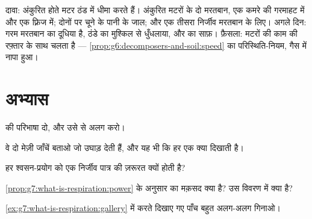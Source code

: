\begin{example}[ठंडे बीज पर यह विधि]\label{ex:g7:what-is-respiration:coldseed}
दावा: अंकुरित होते मटर ठंड में धीमा  करते हैं। अंकुरित मटरों के दो
मरतबान, एक कमरे की गरमाहट में और एक फ़्रिज में; दोनों पर चूने के पानी के
जाल; और एक तीसरा निर्जीव मरतबान  के लिए। अगले दिन: गरम मरतबान
का  दूधिया है, ठंडे का मुश्किल से धुँधलाया, और  का
साफ़। फ़ैसला:  मटरों की काम की रफ़्तार के साथ चलता है ---
\cref{prop:g6:decomposers-and-soil:speed} का परिस्थिति-नियम, गैस में
नापा हुआ।
\end{example}

\section{अभ्यास}

\begin{exercise}[$\star$]\label{exo:g7:what-is-respiration:1}
 की परिभाषा दो, और उसे  से अलग करो।
\end{exercise}

\begin{exercise}[$\star$]\label{exo:g7:what-is-respiration:2}
वे दो मेज़ी जाँचें बताओ जो  उघाड़ देती हैं, और यह भी कि हर एक क्या
दिखाती है।
\end{exercise}

\begin{exercise}[$\star$]\label{exo:g7:what-is-respiration:3}
हर श्वसन-प्रयोग को एक निर्जीव  पात्र की ज़रूरत क्यों होती है?
\end{exercise}

\begin{exercise}[$\star$]\label{exo:g7:what-is-respiration:4}
\cref{prop:g7:what-is-respiration:power} के अनुसार  का मक़सद क्या
है? उस विवरण में  क्या है?
\end{exercise}

\begin{exercise}[$\star$]\label{exo:g7:what-is-respiration:5}
\cref{ex:g7:what-is-respiration:gallery} में  करते दिखाए गए पाँच
बहुत अलग-अलग  गिनाओ।
\end{exercise}

